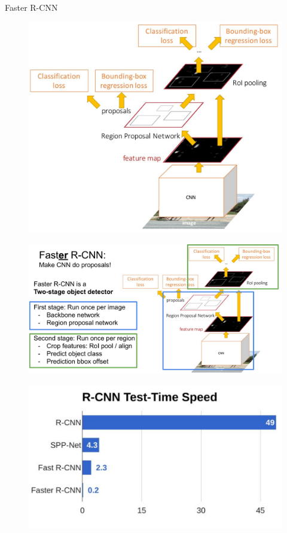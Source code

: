 \begin{frame}[allowframebreaks]{Faster R-CNN}
    \begin{figure}
        \centering
        \includegraphics[width=1.0\textwidth,height=0.9\textheight,keepaspectratio]{images/object-detect/faster_rcnn_1.png}
    \end{figure}

\framebreak

    \begin{figure}
        \centering
        \includegraphics[width=1.0\textwidth,height=1.0\textheight,keepaspectratio]{images/object-detect/faster_rcnn_2.png}
    \end{figure}

\framebreak

    \begin{figure}
        \centering
        \includegraphics[width=1.0\textwidth,height=1.0\textheight,keepaspectratio]{images/object-detect/faster_rcnn_3.png}
    \end{figure}
\end{frame}